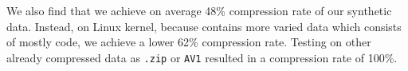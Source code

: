 We also find that we achieve on average 48\% compression rate of our synthetic data. Instead, on Linux kernel, because contains more varied data which consists of mostly code, we achieve a lower 62\% compression rate. Testing on other already compressed data as \verb|.zip| or \verb|AV1| resulted in a compression rate of 100\%.

